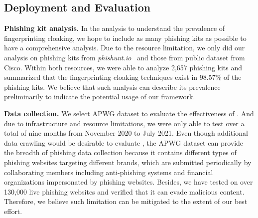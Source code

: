

\subsection{\spartacus Deployment and Evaluation}

\noindent
\textbf{Phishing kit analysis.}
In the analysis to understand the prevalence of fingerprinting cloaking, we hope to include as many phishing kits as possible to have a comprehensive analysis.
Due to the resource limitation, we only did our analysis on phishing kits from \emph{phishunt.io}~\cite{phishunt} and those from public dataset from Cisco.
Within both resources, we were able to analyze 2,657 phishing kits and summarized that the fingerprinting cloaking techniques exist in 98.57\% of the phishing kits.
We believe that such analysis can describe its prevalence preliminarily to indicate the potential usage of our \spartacus framework.


\noindent
\textbf{Data collection.}
We select APWG dataset to evaluate the effectiveness of \spartacus.
And due to infrastructure and resource limitations, we were only able to test \spartacus over a total of nine months from November 2020 to July 2021.
Even though additional data crawling would be desirable to evaluate \spartacus,
the APWG dataset can provide the breadth of phishing data collection because it contains different types of phishing websites targeting different brands, which are submitted periodically by collaborating members including anti-phishing systems and financial organizations impersonated by phishing websites.
Besides, we have tested \spartacus on over 130,000 live phishing websites and verified that it can evade malicious content.
Therefore, we believe such limitation can be mitigated to the extent of our best effort.

